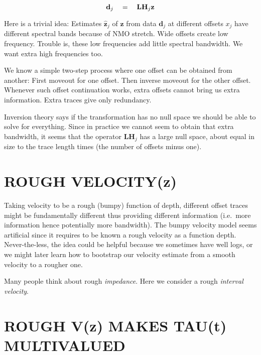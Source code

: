 \begin{equation}
\mathbf d_j \quad =\quad  \mathbf L \mathbf H_j \mathbf z
\end{equation}
\par
Here is a trivial idea:
Estimates $\hat{\mathbf z}_j$
of $\mathbf z$ from data
$\mathbf d_j$
at different offsets $x_j$
have different spectral bands because of NMO stretch.
Wide offsets create low frequency.
Trouble is, these low frequencies add little spectral bandwidth.
We want extra high frequencies too.

\par
We know a simple two-step process where
one offset can be obtained from another:
First moveout for one offset.  Then inverse moveout for the other offset.
Whenever such offset continuation works,
extra offsets cannot bring us extra information.
Extra traces give only redundancy.

\par
Inversion theory says if the transformation has no null space
we should be able to solve for everything.
Since in practice we cannot seem to obtain that extra bandwidth,
it seems that
the operator $\mathbf L \mathbf H_j $
has a large null space,
about equal in size to the trace length times
(the number of offsets minus one).



\section{ROUGH VELOCITY(z)}

Taking velocity to be a rough (bumpy) function of depth,
different offset traces might be fundamentally different
thus providing different information
(i.e.~more information hence potentially more bandwidth).
The bumpy velocity model
seems artificial since it requires
to be known a rough velocity as a function depth.
Never-the-less, the idea could be helpful
because
we sometimes have well logs,
or we might later
learn how to bootstrap our velocity estimate
from a smooth velocity to a rougher one.

\par
Many people think about rough {\it impedance}.
Here we consider a rough {\it interval velocity}.


\section{ROUGH V(z) MAKES TAU(t) MULTIVALUED}


